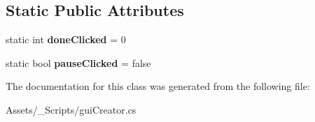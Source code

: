 \subsection*{Static Public Attributes}
\begin{DoxyCompactItemize}
\item 
\hypertarget{classgui_creator_ad3bf7aa843b0a0304c98ebd2d2b61fd2}{}static int {\bfseries done\+Clicked} = 0\label{classgui_creator_ad3bf7aa843b0a0304c98ebd2d2b61fd2}

\item 
\hypertarget{classgui_creator_a333c8fa8c7e68fcfb6d903333180517a}{}static bool {\bfseries pause\+Clicked} = false\label{classgui_creator_a333c8fa8c7e68fcfb6d903333180517a}

\end{DoxyCompactItemize}


The documentation for this class was generated from the following file\+:\begin{DoxyCompactItemize}
\item 
Assets/\+\_\+\+Scripts/gui\+Creator.\+cs\end{DoxyCompactItemize}
